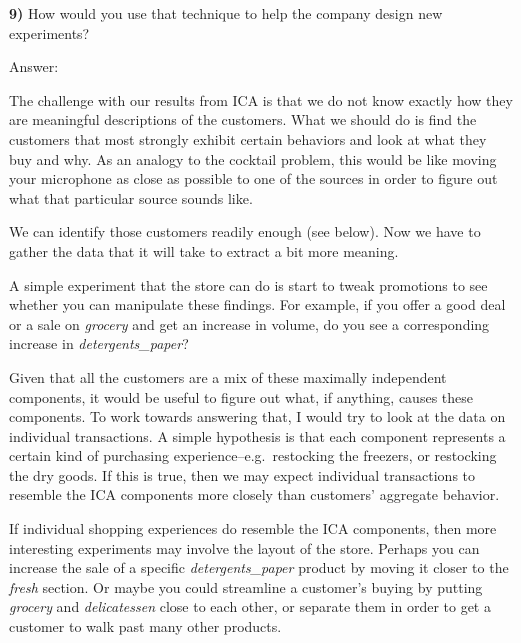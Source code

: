 \documentclass{article}
\begin{document}
    \textbf{9)} How would you use that technique to help the company design
new experiments?

    Answer:

The challenge with our results from ICA is that we do not know exactly
how they are meaningful descriptions of the customers. What we should do
is find the customers that most strongly exhibit certain behaviors and
look at what they buy and why. As an analogy to the cocktail problem,
this would be like moving your microphone as close as possible to one of
the sources in order to figure out what that particular source sounds
like.

We can identify those customers readily enough (see below). Now we have
to gather the data that it will take to extract a bit more meaning.

A simple experiment that the store can do is start to tweak promotions
to see whether you can manipulate these findings. For example, if you
offer a good deal or a sale on \emph{grocery} and get an increase in
volume, do you see a corresponding increase in \emph{detergents\_paper}?

Given that all the customers are a mix of these maximally independent
components, it would be useful to figure out what, if anything, causes
these components. To work towards answering that, I would try to look at
the data on individual transactions. A simple hypothesis is that each
component represents a certain kind of purchasing
experience--e.g.~restocking the freezers, or restocking the dry goods.
If this is true, then we may expect individual transactions to resemble
the ICA components more closely than customers' aggregate behavior.

If individual shopping experiences do resemble the ICA components, then
more interesting experiments may involve the layout of the store.
Perhaps you can increase the sale of a specific \emph{detergents\_paper}
product by moving it closer to the \emph{fresh} section. Or maybe you
could streamline a customer's buying by putting \emph{grocery} and
\emph{delicatessen} close to each other, or separate them in order to
get a customer to walk past many other products.
\end{document}

